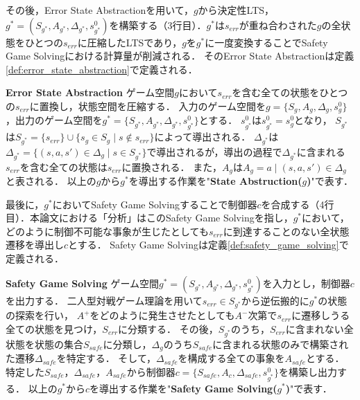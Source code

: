 その後，Error State Abstractionを用いて，$g$から決定性LTS，$g^* = (S_{g^*}, A_{g^*}, \Delta_{g^*}, s^0_{g^*})$を構築する（3行目）．$g^*$は$s_{err}$が重ね合わされた$g$の全状態をひとつの$s_{err}$に圧縮したLTSであり，$g$を$g^*$に一度変換することでSafety Game Solvingにおける計算量が削減される．
そのError State Abstractionは定義\ref{def:error_state_abstraction}で定義される．
\begin{dfn}{\textbf{Error State Abstraction}}
\label{def:error_state_abstraction}
    ゲーム空間$g$において$s_{err}$を含む全ての状態をひとつの$s_{err}$に置換し，状態空間を圧縮する．
    入力のゲーム空間を$g = \{S_{g}, A_{g}, \Delta_{g}, s^0_{g}\}$，出力のゲーム空間を$g^* = \{S_{g^*}, A_{g^*}, \Delta_{g^*}, s^0_{g^*}\}$とする．
    $s^0_{g^*}$は$s^0_{g^*} = s^0_{g}$となり，
    $S_{g^*}$は$S_{g^*} = \{s_{err}\} \cup \{ s_{g} \in S_{g} \mid s \notin s_{err} \}$によって導出される．
    $\Delta_{g^*}$は$\Delta_{g^*} = \{ (s,a,s') \in \Delta_{g} \mid s \in S_{g^*} \}$で導出されるが，導出の過程で$\Delta_{g^*}$に含まれる$s_{err}$を含む全ての状態は$s_{err}$に置換される．
    また，$A_{g}$は$A_{g} = { a \mid (s,a,s') \in \Delta_{g}}$と表される．
    以上の$g$から$g^*$を導出する作業を"{\bf State Abstruction($g$)}"で表す．
\end{dfn}

最後に，$g^*$においてSafety Game Solvingすることで制御器$c$を合成する（4行目）．本論文における「分析」はこのSafety Game Solvingを指し，$g^*$において，どのように制御不可能な事象が生じたとしても$s_{err}$に到達することのない全状態遷移を導出し$c$とする．
Safety Game Solvingは定義\ref{def:safety_game_solving}で定義される．

\begin{dfn}{\textbf{Safety Game Solving}}
\label{def:safety_game_solving}
    ゲーム空間$g^* = (S_{g^*}, A_{g^*}, \Delta_{g^*}, s^0_{g^*})$を入力とし，制御器$c$を出力する．
    二人型対戦ゲーム理論を用いて$s_{err} \in S_{g^*}$から逆伝搬的に$g^*$の状態の探索を行い，
    $A^+$をどのように発生させたとしても$A^-$次第で$s_{err}$に遷移しうる全ての状態を見つけ，$S_{err}$に分類する．
    その後，$S_{g^*}$のうち，$S_{err}$に含まれない全状態を状態の集合$S_{safe}$に分類し，$\Delta_{g}$のうち$S_{safe}$に含まれる状態のみで構築された遷移$\Delta_{safe}$を特定する．
    そして，$\Delta_{safe}$を構成する全ての事象を$A_{safe}$とする．
    特定した$S_{safe}$，$\Delta_{safe}$，$A_{safe}$から制御器$c=\{S_{safe}, A_{c}, \Delta_{safe}, s^0_{g^*}\}$を構築し出力する．
    以上の$g^*$から$c$を導出する作業を"{\bf Safety Game Solving($g^*$)}"で表す．
\end{dfn}

